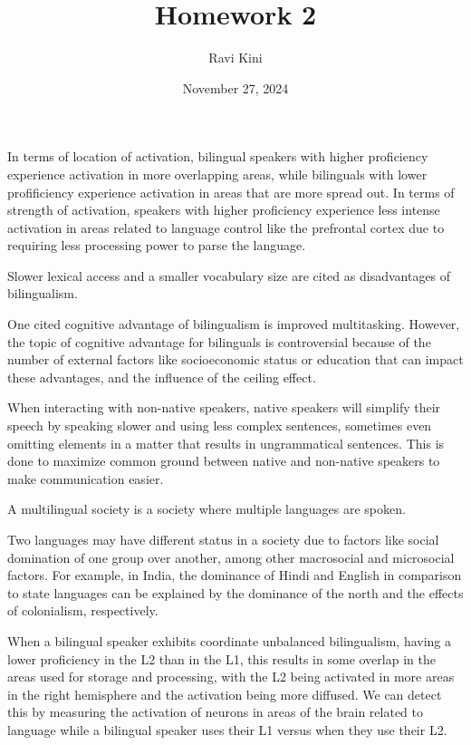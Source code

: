 \documentclass{article}
\title{Homework 2}
\author{Ravi Kini}
\date{November 27, 2024}
\begin{document}
\maketitle

\problem
In terms of location of activation, bilingual speakers with higher proficiency experience activation in more overlapping areas, while bilinguals with lower profificiency experience activation in areas that are more spread out. In terms of strength of activation, speakers with higher proficiency experience less intense activation in areas related to language control like the prefrontal cortex due to requiring less processing power to parse the language.

\clearpage

\problem
Slower lexical access and a smaller vocabulary size are cited as disadvantages of bilingualism.

\clearpage

\problem
One cited cognitive advantage of bilingualism is improved multitasking. However, the topic of cognitive advantage for bilinguals is controversial because of the number of external factors like socioeconomic status or education that can impact these advantages, and the influence of the ceiling effect.

\clearpage

\problem
When interacting with non-native speakers, native speakers will simplify their speech by speaking slower and using less complex sentences, sometimes even omitting elements in a matter that results in ungrammatical sentences. This is done to maximize common ground between native and non-native speakers to make communication easier.


\clearpage

\problem
A multilingual society is a society where multiple languages are spoken.

\clearpage

\problem
Two languages may have different status in a society due to factors like social domination of one group over another, among other macrosocial and microsocial factors. For example, in India, the dominance of Hindi and English in comparison to state languages can be explained by the dominance of the north and the effects of colonialism, respectively.

\clearpage

\problem
When a bilingual speaker exhibits coordinate unbalanced bilingualism, having a lower proficiency in the L2 than in the L1, this results in some overlap in the areas used for storage and processing, with the L2 being activated in more areas in the right hemisphere and the activation being more diffused. We can detect this by measuring the activation of neurons in areas of the brain related to language while a bilingual speaker uses their L1 versus when they use their L2.
\end{document}
